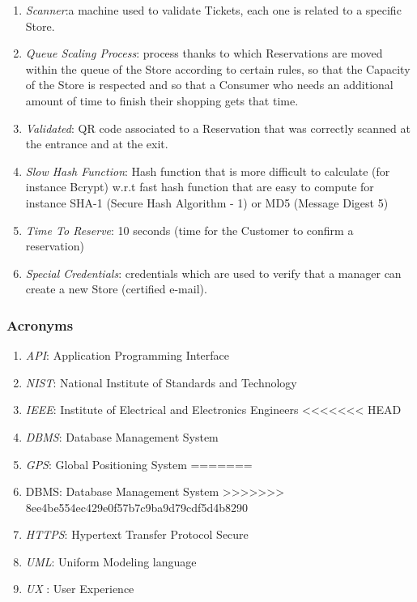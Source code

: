 \documentclass[a4paper, 12pt, oneside]{article}
\begin{document}
\begin{enumerate}[label={D.\arabic{*}}]
\item \label{def:scanner}\textit{Scanner}:a machine used to validate Tickets, each one is related to a specific Store.
\item \label{def:queuescaling}\textit{Queue Scaling Process}: process thanks to which Reservations are moved within the queue of the Store according to certain rules, so that the Capacity of the Store is respected and so that a Consumer who needs an additional amount of time to finish their shopping gets that time.
\item \label{def:validated}\textit{Validated}: QR code associated to a Reservation that was correctly scanned at the entrance and at the exit.
\item \label{def:slowHashFunction}\textit{Slow Hash Function}: Hash function that is more difficult to calculate (for instance Bcrypt) w.r.t fast hash function that are easy to compute for instance SHA-1 (Secure Hash Algorithm - 1) or MD5 (Message Digest 5)
\item \label{def:timeToReserve}\textit{Time To Reserve}: 10 seconds (time for the Customer to confirm a reservation)
\item \label{def:specialCredentials} \textit{Special Credentials}: credentials which are used to verify that a manager can create a new Store (certified e-mail).
\end{enumerate}

\subsubsection{Acronyms}
\begin{enumerate}[label={A.\arabic{*}}]
\item \label{def:API}\textit{API}: Application Programming Interface
\item \label{def:NIST}\textit{NIST}: National Institute of Standards and Technology
\item \label{def:IEEE}\textit{IEEE}: Institute of Electrical and Electronics Engineers
<<<<<<< HEAD
\item \label{def:DBMS}\textit{DBMS}: Database Management System
\item \label{def:GPS} \textit{GPS}: Global Positioning System
=======
\item \label{def:DBMS} DBMS: Database Management System
>>>>>>> 8ee4be554ec429e0f57b7c9ba9d79cdf5d4b8290
\item \label{def:HTTPS}\textit{HTTPS}: Hypertext Transfer Protocol Secure
\item \label{def:UML}\textit{UML}: Uniform Modeling language
\item \label{def:UX}\textit{UX} : User Experience
\end{enumerate}
\end{document}
